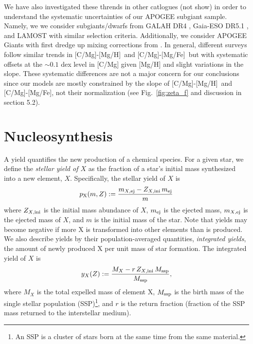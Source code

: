 \documentclass[fleqn,
referee, %
usenatbib]{mnras}
\newcommand{\caah}{[C/Mg]-[Mg/H]}
\newcommand{\caafe}{[C/Mg]-[Mg/Fe]}
\newcommand{\y}{p}
\newcommand{\dbadd}[1]{{\color{Thistle} #1}}
\begin{document}
We have also investigated these thrends in other catlogues (not show) in order to understand the systematic uncertainties of our APOGEE subgiant sample.
Namely, we we consider subgiants/dwarfs from GALAH DR4 \citep{galah_dr4}, Gaia-ESO DR5.1 \citep{gaiaeso_dr5.1}, and LAMOST \citep{lamost} with similar selection criteria. Additionally, we consider APOGEE Giants with first dredge up mixing corrections from \citep{vincenzo+21}.
In general, different surveys follow similar trends in \caah\ and \caafe\ but with systematic offsets at the $\sim{0.1}$ dex level in [C/Mg] given [Mg/H] and slight variations in the slope.
These systematic differences are not a major concern for our conclusions since our models are mostly constrained by the slope of \caah\ and \caafe,  not their normalization (see Fig.~\ref{fig:zeta_f} and discussion in section \dbadd{5.2}).

\section{Nucleosynthesis}\label{sec:nucleosynthesis}

A yield quantifies the new production of a chemical species. For a given star, we define the {\it stellar yield of $X$} as the fraction of a star's initial mass synthesized into a new element, $X$. Specifically, the stellar yield of $X$ is
\begin{equation} \label{eq:stellar_yield_def}
   \y_{\rm X}(m, Z) := 
    \frac{m_{X, \rm ej}- Z_{X,\rm  ini}\,m_{\rm ej}}{m}
\end{equation}
where $Z_{X,\rm ini}$ is the initial mass abundance of $X$, $m_{\rm ej}$ is the ejected mass, $m_{X, \rm ej}$ is the ejected mass of $X$, and $m$ is the initial mass of the star.
Note that yields may become negative if more X is transformed into other elements than is produced.
We also describe yields by their population-averaged quantities, {\it integrated yields}, the amount of newly produced X per unit mass of star formation. 
The integrated yield of $X$ is
\begin{equation} 
   y_{X}(Z) := 
    \frac{M_X - r\,Z_{X, \rm ini}\,M_{\rm ssp}}{M_{\rm ssp}},
\end{equation}
where $M_X$ is the total expelled mass of element X, $M_{\rm ssp}$ is the birth mass of the single stellar population (SSP)\footnote{An SSP is a cluster of stars born at the same time from the same material.}, and $r$ is the return fraction (fraction of the SSP mass returned to the interstellar medium). 
\end{document}
